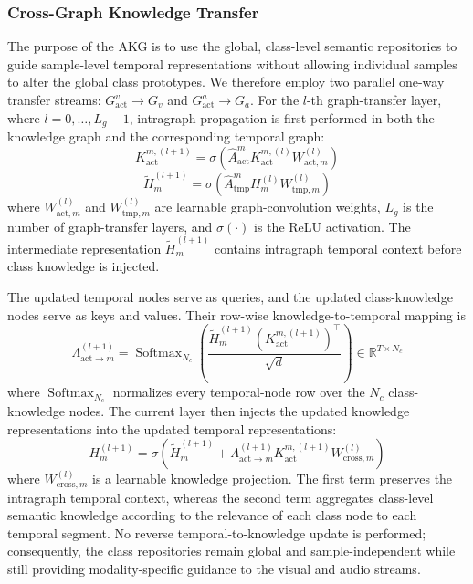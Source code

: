 \documentclass[10pt,journal,twoside]{IEEEtran}
\begin{document}
\subsubsection{Cross-Graph Knowledge Transfer}
The purpose of the AKG is to use the global, class-level semantic repositories to guide sample-level temporal representations without allowing individual samples to alter the global class prototypes. We therefore employ two parallel one-way transfer streams: $G_{\mathrm{act}}^v\rightarrow G_v$ and $G_{\mathrm{act}}^a\rightarrow G_a$. For the $l$-th graph-transfer layer, where $l=0,\ldots,L_g-1$, intragraph propagation is first performed in both the knowledge graph and the corresponding temporal graph:
\begin{equation}
K_{\mathrm{act}}^{m,(l+1)}=
\sigma\left(
\widehat A_{\mathrm{act}}^mK_{\mathrm{act}}^{m,(l)}W_{\mathrm{act},m}^{(l)}
\right)
\end{equation}
\begin{equation}
\widetilde H_m^{(l+1)}=
\sigma\left(
\widehat A_{\mathrm{tmp}}^mH_m^{(l)}W_{\mathrm{tmp},m}^{(l)}
\right)
\end{equation}
where $W_{\mathrm{act},m}^{(l)}$ and $W_{\mathrm{tmp},m}^{(l)}$ are learnable graph-convolution weights, $L_g$ is the number of graph-transfer layers, and $\sigma(\cdot)$ is the ReLU activation. The intermediate representation $\widetilde H_m^{(l+1)}$ contains intragraph temporal context before class knowledge is injected.

The updated temporal nodes serve as queries, and the updated class-knowledge nodes serve as keys and values. Their row-wise knowledge-to-temporal mapping is
\begin{equation}
\Lambda_{\mathrm{act}\rightarrow m}^{(l+1)}=
\operatorname{Softmax}_{N_c}\left(
\frac{\widetilde H_m^{(l+1)}\left(K_{\mathrm{act}}^{m,(l+1)}\right)^{\top}}{\sqrt{d}}
\right)
\in\mathbb{R}^{T\times N_c}
\end{equation}
where $\operatorname{Softmax}_{N_c}$ normalizes every temporal-node row over the $N_c$ class-knowledge nodes. The current layer then injects the updated knowledge representations into the updated temporal representations:
\begin{equation}
H_m^{(l+1)}=
\sigma\left(
\widetilde H_m^{(l+1)}+
\Lambda_{\mathrm{act}\rightarrow m}^{(l+1)}
K_{\mathrm{act}}^{m,(l+1)}W_{\mathrm{cross},m}^{(l)}
\right)
\end{equation}
where $W_{\mathrm{cross},m}^{(l)}$ is a learnable knowledge projection. The first term preserves the intragraph temporal context, whereas the second term aggregates class-level semantic knowledge according to the relevance of each class node to each temporal segment. No reverse temporal-to-knowledge update is performed; consequently, the class repositories remain global and sample-independent while still providing modality-specific guidance to the visual and audio streams.
\end{document}
